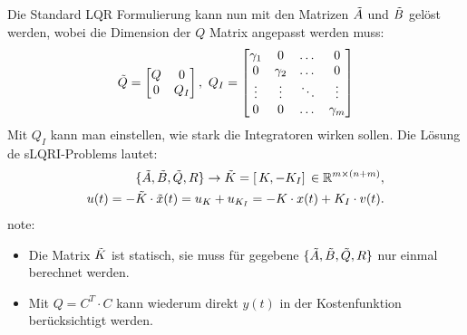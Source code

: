 Die Standard LQR Formulierung kann nun mit den Matrizen $\Tilde{A}$ und $\Tilde{B}$ gelöst werden, wobei die Dimension der $Q$ Matrix angepasst werden muss:
\[\Tilde{Q} =\begin{bmatrix} Q & 0 \\ 0 & Q_I\end{bmatrix},\ Q_I = \begin{bmatrix}
    \gamma_1 & 0 & \dots & 0 \\
    0 & \gamma_2 & \dots & 0\\
    \vdots & \vdots &\ddots &   \vdots\\
    0 & 0 & \dots &\gamma_m
\end{bmatrix}\]
Mit $Q_I$ kann man einstellen, wie stark die Integratoren wirken sollen. Die Lösung de sLQRI-Problems lautet:
\begin{align*}
    \{\Tilde{A},\Tilde{B},\Tilde{Q},R\}\rightarrow \Tilde{K}=[\,K, - K_I]\, \in \mathbb{R}^{m\times(n+m)},\\
    u(t) = -\Tilde{K}\cdot\Tilde{x}(t) = u_K + u_{K_I} = -K\cdot x(t) + K_I\cdot v(t).
\end{align*}
note: \begin{itemize}
    \item Die Matrix $\Tilde{K}$ ist statisch, sie muss für gegebene $\{\Tilde{A},\Tilde{B},\Tilde{Q},R\}$ nur einmal berechnet werden.
    \item Mit $Q = C^T \cdot C$ kann wiederum direkt $y(t)$ in der Kostenfunktion berücksichtigt werden. 
\end{itemize}